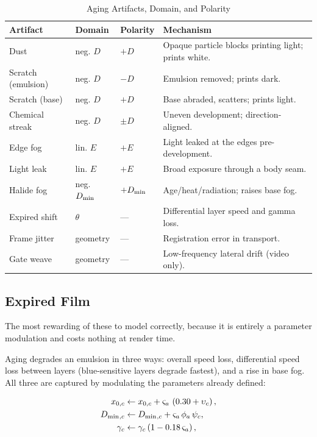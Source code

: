 \begin{table}[htbp]
\caption{Aging Artifacts, Domain, and Polarity}
\label{tab:aging}
\begin{center}
\renewcommand{\arraystretch}{1.15}
\begin{tabularx}{\columnwidth}{@{}l l l >{\raggedright\arraybackslash}X@{}}
\toprule
\textbf{Artifact} & \textbf{Domain} & \textbf{Polarity} & \textbf{Mechanism} \\
\midrule
Dust           & neg. $D$   & $+D$ & Opaque particle blocks printing light; prints white. \\
Scratch (emulsion) & neg. $D$ & $-D$ & Emulsion removed; prints dark. \\
Scratch (base) & neg. $D$   & $+D$ & Base abraded, scatters; prints light. \\
Chemical streak & neg. $D$  & $\pm D$ & Uneven development; direction-aligned. \\
Edge fog       & lin. $E$   & $+E$ & Light leaked at the edges pre-development. \\
Light leak     & lin. $E$   & $+E$ & Broad exposure through a body seam. \\
Halide fog     & neg. $D_{\min}$ & $+D_{\min}$ & Age/heat/radiation; raises base fog. \\
Expired shift  & $\theta$   & --- & Differential layer speed and gamma loss. \\
Frame jitter   & geometry   & --- & Registration error in transport. \\
Gate weave     & geometry   & --- & Low-frequency lateral drift (video only). \\
\bottomrule
\end{tabularx}
\end{center}
\end{table}

\subsection{Expired Film}

The most rewarding of these to model correctly, because it is entirely a
parameter modulation and costs nothing at render time.

Aging degrades an emulsion in three ways: overall speed loss, differential speed
loss between layers (blue-sensitive layers degrade fastest), and a rise in base
fog. All three are captured by modulating the parameters already defined:

\begin{align}
x_{0,c} &\leftarrow x_{0,c} + \varsigma_a\, \left(0.30 + \upsilon_c\right), \\
D_{\min}{}_{,c} &\leftarrow D_{\min}{}_{,c} + \varsigma_a\, \phi_a\, \psi_c, \\
\gamma_c &\leftarrow \gamma_c \left(1 - 0.18\,\varsigma_a\right),
\label{eq:expired}
\end{align}

